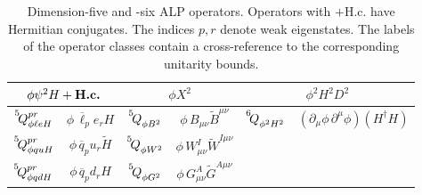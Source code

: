 \begin{table}[htbp]
\centering
\setlength{\tabcolsep}{1pt}
\renewcommand{\arraystretch}{1.5}
\begin{tabular}{ c|c||c|c||c|c }
\toprule
\multicolumn{2}{c||}{\cellcolor{hdrcolor}\hyperref[par:phipsi2H]{\boldmath$\phi\psi^2 H+\text{\bf H.c.}$}} & \multicolumn{2}{c||}{\cellcolor{hdrcolor}\hyperref[par:phiX2]{\boldmath$\phi X^2$}} & \multicolumn{2}{c}{\cellcolor{hdrcolor}\hyperref[par:phi2H2D2]{\boldmath$\phi^2 H^2 D^2$}} \\
\hline
$\op{5}{\phi \ell e H}{pr}$ & $\phi\, \overline \ell_p  e_r H$ & $\op{5}{\phi B^2}{}$ & $\phi\, B_{\mu\nu}\widetilde B^{\mu\nu}$&$\op{6}{\phi^2 H^2}{}$& $(\partial_\mu \phi\, \partial^\mu \phi)(H^\dagger H)$ 
\\ 
$\op{5}{\phi q u H}{pr}$ & $\phi\, \overline q_p  u_r \widetilde H$ & $\op{5}{\phi W^2}{}$ & $\phi\, W^I_{\mu\nu}\widetilde W^{I \mu\nu}$ &\multicolumn{2}{c}{}
\\
$\op{5}{\phi q d H}{pr}$ & $\phi\, \overline q_p  d_r H$ & $\op{5}{\phi G^2}{}$ & $\phi\, G^A_{\mu\nu}\widetilde G^{A\mu\nu}$ &\multicolumn{2}{c}{}
\\
\bottomrule
\end{tabular}
\caption{Dimension-five and -six ALP operators.
Operators with $+ \text{H.c.}$ have Hermitian conjugates.
The indices $p,r$ denote weak eigenstates. The labels of the operator classes contain a cross-reference to the corresponding unitarity bounds.\label{tab:ALPdim5-6}}
\end{table}
